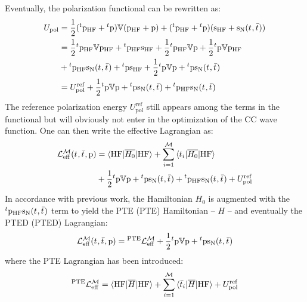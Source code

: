 Eventually, the polarization functional can be rewritten as:
\begin{equation}
  \begin{aligned}
  U_\mathrm{pol}
  &=
  \frac{1}{2}({}^t\mathrm{p}_\mathrm{HF}+{}^t\mathrm{p})\mathbb{V}(\mathrm{p}_\mathrm{HF}+\mathrm{p})
  + ({}^t\mathrm{p}_\mathrm{HF}+{}^t\mathrm{p})(\mathrm{s}_\mathrm{HF}+\mathrm{s}_{\mathrm{N}}(t_{},\bar{t}_{})) \\
  &=
    \frac{1}{2}{}^t\mathrm{p}_\mathrm{HF}\mathbb{V}\mathrm{p}_\mathrm{HF} + {}^t\mathrm{p}_\mathrm{HF}\mathrm{s}_\mathrm{HF}
  + \frac{1}{2}{}^t\mathrm{p}_\mathrm{HF}\mathbb{V}\mathrm{p} + \frac{1}{2}{}^t\mathrm{p}\mathbb{V}\mathrm{p}_\mathrm{HF} \\
  &+ {}^t\mathrm{p}_\mathrm{HF}\mathrm{s}_{\mathrm{N}}(t_{},\bar{t}_{})
  + {}^t\mathrm{p}\mathrm{s}_\mathrm{HF}
  + \frac{1}{2}{}^t\mathrm{p}\mathbb{V}\mathrm{p} + {}^t\mathrm{p}\mathrm{s}_{\mathrm{N}}(t_{},\bar{t}_{}) \\
  &=
    U_\mathrm{pol}^\mathrm{ref}
  + \frac{1}{2}{}^t\mathrm{p}\mathbb{V}\mathrm{p} + {}^t\mathrm{p}\mathrm{s}_{\mathrm{N}}(t_{},\bar{t}_{})
  + {}^t\mathrm{p}_\mathrm{HF}\mathrm{s}_{\mathrm{N}}(t_{},\bar{t}_{})
  \end{aligned}
\end{equation}
The reference polarization energy $U_\mathrm{pol}^\mathrm{ref}$ still
appears among the terms in the functional but will obviously not enter
in the optimization of the \acrshort{CC} wave function.
One can then write the effective Lagrangian as:
\begin{equation}
  \begin{aligned}
  \mathcal{L}^\mathcal{M}_\mathrm{eff}(t_{}, \bar{t}_{}, \mathrm{p}) &=
  \braket{\mathrm{HF} | \overline{H_0} | \mathrm{HF}}
  + \sum_{i=1}^{\mathcal{M}}\braket{t_{i} | \overline{H_0} | \mathrm{HF}} \\
  &+
  \frac{1}{2}{}^t\mathrm{p}\mathbb{V}\mathrm{p} + {}^t\mathrm{p}\mathrm{s}_{\mathrm{N}}(t_{},\bar{t}_{})
  + {}^t\mathrm{p}_\mathrm{HF}\mathrm{s}_{\mathrm{N}}(t_{},\bar{t}_{})
  + U_\mathrm{pol}^\mathrm{ref}
  \end{aligned}
\end{equation}
In accordance with previous work,\autocite{Cammi2009-gu,
Caricato2011-tx} the Hamiltonian $H_0$ is augmented with the
${}^t\mathrm{p}_\mathrm{HF}\mathrm{s}_{\mathrm{N}}(t_{},\bar{t}_{})$ term to yield the
\acrlong*{PTE} (\acrshort{PTE}) Hamiltonian -- $H$ -- and eventually the
\acrlong*{PTED} (\acrshort{PTED}) Lagrangian:\autocite{Olivares_del_Valle1991-of,
Aguilar1991-vq, Olivares_del_Valle1991-tq, Olivares_del_Valle1993-xq,
Olivares_del_Valle1993-ra, Lipparini2009-io}
\begin{equation}\label{eq:pted-cc}
  \mathcal{L}^\mathcal{M}_\mathrm{eff}(t_{}, \bar{t}_{}, \mathrm{p}) =
  {}^\mathrm{PTE}\mathcal{L}^\mathcal{M}_\mathrm{eff}
  + \frac{1}{2}{}^t\mathrm{p}\mathbb{V}\mathrm{p} + {}^t\mathrm{p}\mathrm{s}_{\mathrm{N}}(t_{},\bar{t}_{})
\end{equation}
where the \acrshort{PTE} Lagrangian has been introduced:
\begin{equation}
{}^\mathrm{PTE}\mathcal{L}^\mathcal{M}_\mathrm{eff}
  =
  \braket{\mathrm{HF} | \overline{H} | \mathrm{HF}}
  + \sum_{i=1}^{\mathcal{M}}\braket{\bar{t}_{i} | \overline{H} | \mathrm{HF}}
  + U_\mathrm{pol}^\mathrm{ref}
\end{equation}

